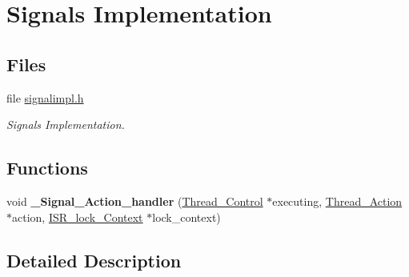 \hypertarget{group__ClassicSignalImpl}{}\section{Signals Implementation}
\label{group__ClassicSignalImpl}
\subsection*{Files}
\begin{DoxyCompactItemize}
\item 
file \mbox{\hyperlink{signalimpl_8h}{signalimpl.\+h}}
\begin{DoxyCompactList}\small\item\em Signals Implementation. \end{DoxyCompactList}\end{DoxyCompactItemize}
\subsection*{Functions}
\begin{DoxyCompactItemize}
\item 
\mbox{\label{group__ClassicSignalImpl_gaaa0e11ca22aa3c8e65543d6df98b9c2d}} 
void {\bfseries \+\_\+\+Signal\+\_\+\+Action\+\_\+handler} (\mbox{\hyperlink{struct__Thread__Control}{Thread\+\_\+\+Control}} $\ast$executing, \mbox{\hyperlink{structThread__Action}{Thread\+\_\+\+Action}} $\ast$action, \mbox{\hyperlink{structISR__lock__Context}{I\+S\+R\+\_\+lock\+\_\+\+Context}} $\ast$lock\+\_\+context)
\end{DoxyCompactItemize}


\subsection{Detailed Description}
